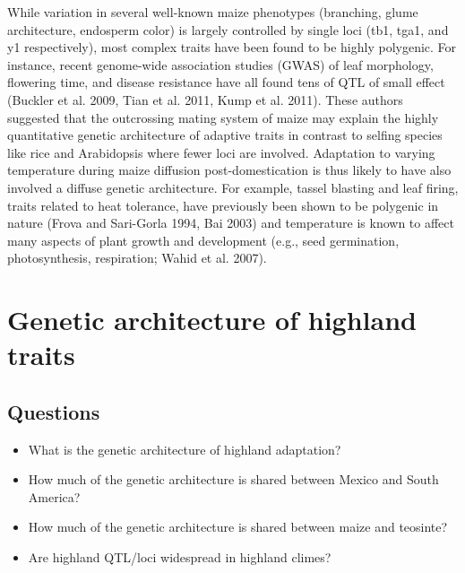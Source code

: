 While variation in several well-known maize phenotypes (branching, glume architecture, endosperm color) is largely controlled by single loci (tb1, tga1, and y1 respectively), most complex traits have been found to be highly polygenic.  For instance, recent genome-wide association studies (GWAS) of leaf morphology, flowering time, and disease resistance have all found tens of QTL of small effect (Buckler et al. 2009, Tian et al. 2011, Kump et al. 2011).  These authors suggested that the outcrossing mating system of maize may explain the highly quantitative genetic architecture of adaptive traits in contrast to selfing species like rice and Arabidopsis where fewer loci are involved.  Adaptation to varying temperature during maize diffusion post-domestication is thus likely to have also involved a diffuse genetic architecture.  For example, tassel blasting and leaf firing, traits related to heat tolerance, have previously been shown to be polygenic in nature (Frova and Sari-Gorla 1994, Bai 2003) and temperature is known to affect many aspects of plant growth and development (e.g., seed germination, photosynthesis, respiration; Wahid et al. 2007).  

\renewcommand{\thesection}{Aim \arabic{section}}
\section{Genetic architecture of highland traits}

\subsection*{Questions}
\begin{itemize}
\item What is the genetic architecture of highland adaptation?
\item How much of the genetic architecture is shared between Mexico and South America?
\item How much of the genetic architecture is shared between maize and teosinte?
\item Are highland QTL/loci widespread in highland climes?
\end{itemize}

